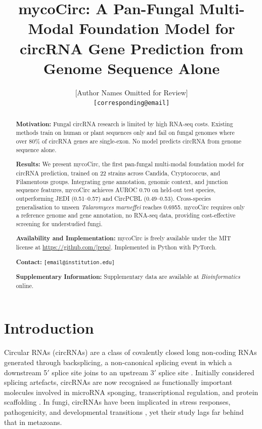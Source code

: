 \documentclass[12pt]{article}
\title{\textbf{mycoCirc: A Pan-Fungal Multi-Modal Foundation Model for circRNA Gene Prediction from Genome Sequence Alone}}
\author{[Author Names Omitted for Review]\\
\texttt{[corresponding@email]}}
\date{}
\begin{document}
\maketitle

\begin{abstract}
\textbf{Motivation:} Fungal circRNA research is limited by high RNA-seq costs. Existing methods train on human or plant sequences only and fail on fungal genomes where over 80\% of circRNA genes are single-exon. No model predicts circRNA from genome sequence alone.

\textbf{Results:} We present mycoCirc, the first pan-fungal multi-modal foundation model for circRNA prediction, trained on 22 strains across Candida, Cryptococcus, and Filamentous groups. Integrating gene annotation, genomic context, and junction sequence features, mycoCirc achieves AUROC 0.70 on held-out test species, outperforming JEDI (0.51--0.57) and CircPCBL (0.49--0.53). Cross-species generalisation to unseen \textit{Talaromyces marneffei} reaches 0.6955. mycoCirc requires only a reference genome and gene annotation, no RNA-seq data, providing cost-effective screening for understudied fungi.

\textbf{Availability and Implementation:} mycoCirc is freely available under the MIT license at \url{https://github.com/[repo]}. Implemented in Python with PyTorch.

\textbf{Contact:} \texttt{[email@institution.edu]}

\textbf{Supplementary Information:} Supplementary data are available at \textit{Bioinformatics} online.
\end{abstract}

\section{Introduction}

Circular RNAs (circRNAs) are a class of covalently closed long non-coding RNAs generated through backsplicing, a non-canonical splicing event in which a downstream 5$'$ splice site joins to an upstream 3$'$ splice site \cite{chen2015regulation, kristensen2019biogenesis}. Initially considered splicing artefacts, circRNAs are now recognised as functionally important molecules involved in microRNA sponging, transcriptional regulation, and protein scaffolding \cite{memczak2013circular, hansen2013natural}. In fungi, circRNAs have been implicated in stress responses, pathogenicity, and developmental transitions \cite{wang2020identification, zhang2021circular}, yet their study lags far behind that in metazoans.
\end{document}
